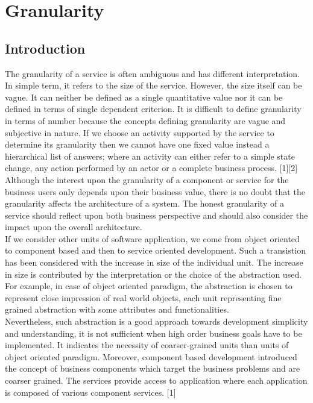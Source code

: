\chapter{Granularity}\label{chapter:granularity}
\section{Introduction}\label{section:granularity/introduction}
The granularity of a service is often ambiguous and has different interpretation. In simple term, it refers to the size of the service. However, the size itself can be vague. It can neither be defined as a single quantitative value nor it can be defined in terms of single dependent criterion. It is difficult to define granularity in terms of number because the concepts defining granularity are vague and subjective in nature. If we choose an activity supported by the service to determine its granularity then we cannot have one fixed value instead a hierarchical list of answers; where an activity can either refer to a simple state change, any action performed by an actor or a complete business process. [1][2]
\\
Although the interest upon the granularity of a component or service for the business users only depends upon their business value, there is no doubt that the granularity affects the architecture of a system. The honest granularity of a service should reflect upon both business perspective and should also consider the impact upon the overall architecture.
\\
If we consider other units of software application, we come from object oriented to component based and then to service oriented development. Such a transistion has been considered with the increase in size of the individual unit. The increase in size is contributed by the interpretation or the choice of the abstraction used. For example, in case of object oriented paradigm, the abstraction is chosen to represent close impression of real world objects, each unit representing fine grained abstraction with some attributes and functionalities. 
\\
Nevertheless, such abstraction is a good approach towards development simplicity and understanding, it is not sufficient when high order business goals have to be implemented. It indicates the necessity of coarser-grained units than units of object oriented paradigm. Moreover, component based development introduced the concept of business components which target the business problems and are coarser grained. The services provide access to application where each application is composed of various component services. [1]


